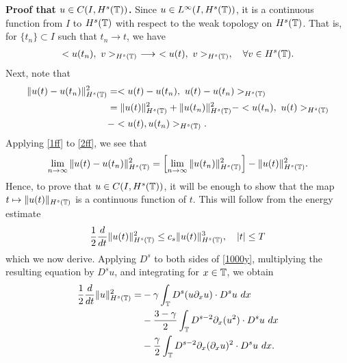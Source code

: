 \textbf{Proof that $u \in C(I, H^s(\mathbb{T}))$.} Since $u \in L^\infty(I, 
H^s(\mathbb{T}))$, it is a
continuous function from $I$ to $H^s(\mathbb{T})$ with respect to the weak
topology on $H^s(\mathbb{T})$. That is, for $\{t_n\} \subset I$ such that $t_n \to t$, we
have
%
%
\begin{equation}
\begin{split}
<u(t_n), \ v>_{H^s(\mathbb{T})} \ \longrightarrow \
<u(t), \ v>_{H^s(\mathbb{T})}, \quad \forall
v \in H^s(\mathbb{T}).
\label{1ff}
\end{split}
\end{equation}
%
%
Next, note that
%
%
\begin{equation}
\begin{split}
 \|u(t) - u(t_n) \|_{H^s(\mathbb{T})}^2
& = <u(t) - u(t_n), \ u(t) -
u(t_n)>_{H^s(\mathbb{T})}
\\
& = \|u(t)\|_{H^s(\mathbb{T})}^2 + \|u(t_n)\|_{H^s(\mathbb{T})}^2
 - <u(t_n), \
u(t) >_{H^s(\mathbb{T})} 
\\
& - <u(t), u(t_n)>_{H^s(\mathbb{T})}.
\label{2ff}
\end{split}
\end{equation}
%
%
%
%
Applying \eqref{1ff} to \eqref{2ff}, we see that
%
%
\begin{equation}
\begin{split}
\lim_{n \to \infty} \|u(t) - u(t_n)\|_{H^s(\mathbb{T})}^2 = \left[ \lim_{n
\to \infty} \|u(t_n)\|_{H^s(\mathbb{T})}^2
\right] - \|u(t)\|_{H^s(\mathbb{T})}^2.
\label{3ff}
\end{split}
\end{equation}
%
%
Hence, to prove that $u \in C(I, H^s(\mathbb{T}))$, it will be
enough to show that the map $t \mapsto \|u(t)\|_{H^s(\mathbb{T})}$ is a continuous
function of $t$. This will follow from the energy
estimate
%
%
\begin{equation}
\label{en-est-u}
\frac{1}{2} \frac{d}{dt} \|u(t)\|_{H^s(\mathbb{T})}^2
\le c_s \|u(t)\|_{H^s(\mathbb{T})}^3, \quad |t| \le T
\end{equation}
%
%
which we now derive. Applying $D^s$ to both sides of
\eqref{1000y}, multiplying the
resulting equation by $D^s u$, and integrating for $x\in \mathbb{T}$, we obtain
%
%
\begin{equation}
\begin{split}
\label{bound-int}
 \frac 12
 \frac{d}{dt} \|u \|_{H^s(\ci)}^2
 =
& -
\gamma \int_{\ci}   D^s (u \p_x u) \cdot
D^s u \  dx
\\
& - \frac{3 -\gamma}{2} \int_{\ci}  D^{s-2} \p_x (u^2) \cdot D^s u \ dx
\\
& - \frac{\gamma}{2} \int_{\ci}   D^{s-2} \p_x (\p_x u)^2
\cdot D^s u \ dx.
\end{split}
\end{equation}
